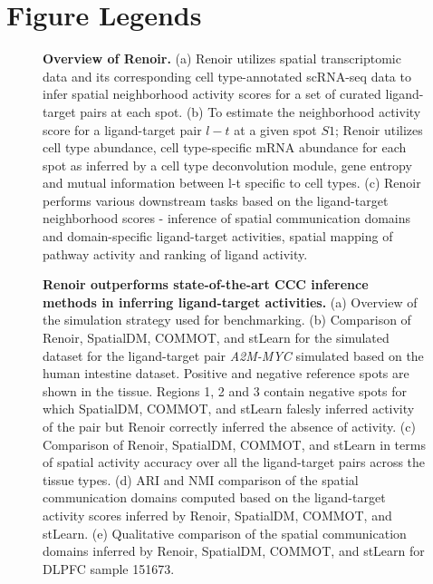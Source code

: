 \clearpage
\section*{Figure Legends}
\singlespacing
\begin{figure}[H]
    \centering
    \caption{\textbf{Overview of Renoir.} (a) Renoir utilizes spatial transcriptomic data and its corresponding cell type-annotated scRNA-seq data to infer spatial neighborhood activity scores for a set of curated ligand-target pairs at each spot. (b) To estimate the neighborhood activity score for a ligand-target pair $l-t$ at a given spot $S1$; Renoir utilizes cell type abundance, cell type-specific mRNA abundance for each spot as inferred by a cell type deconvolution module, gene entropy and mutual information between l-t specific to cell types. (c) Renoir performs various downstream tasks based on the ligand-target neighborhood scores - inference of spatial communication domains and domain-specific ligand-target activities, spatial mapping of pathway activity and ranking of ligand activity.}
    \label{Overview}
\end{figure}

\begin{figure}[H]
    \centering
    \caption{\textbf{Renoir outperforms state-of-the-art CCC inference methods in inferring ligand-target activities.} (a) Overview of the simulation strategy used for benchmarking. (b) Comparison of Renoir, SpatialDM, COMMOT, and stLearn for the simulated dataset for the ligand-target pair \textit{A2M-MYC} simulated based on the human intestine dataset. Positive and negative reference spots are shown in the tissue. Regions 1, 2 and 3 contain negative spots for which SpatialDM, COMMOT, and stLearn falesly inferred activity of the pair but Renoir correctly inferred the absence of activity. (c) Comparison of Renoir, SpatialDM, COMMOT, and stLearn in terms of spatial activity accuracy over all the ligand-target pairs across the tissue types. (d) ARI and NMI comparison of the spatial communication domains computed based on the ligand-target activity scores inferred by Renoir, SpatialDM, COMMOT, and stLearn. (e) Qualitative comparison of the spatial communication domains inferred by Renoir, SpatialDM, COMMOT, and stLearn for DLPFC sample 151673.}
    \label{Benchmark}
\end{figure}

